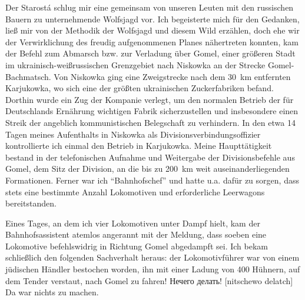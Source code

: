 \documentclass[a5paper,pagesize,10pt,twoside=true]{scrbook}
\newcommand\textcyr[1]{{\fontencoding{OT2}\fontfamily{wncyr}\selectfont #1}}	%
\renewcommand{\marginpar}[2][]{}
\begin{document}
Der Starostá schlug mir eine gemeinsam von unseren Leuten mit den russischen Bauern zu unternehmende Wolfsjagd vor. Ich begeisterte mich für den Gedanken, ließ mir von der Methodik der Wolfsjagd und diesem Wild erzählen, doch ehe wir der Verwirklichung des freudig aufgenommenen Planes nähertreten konnten, kam der Befehl zum Abmarsch bzw. zur Verladung über Gomel, einer größeren Stadt im ukrainisch-weißrussischen Grenzgebiet nach Niskowka an der Strecke Gomel-Bachmatsch. \marginpar{348} Von Niskowka ging eine Zweigstrecke nach dem 30~km entfernten Karjukowka, wo sich eine der größten ukrainischen Zuckerfabriken befand. Dorthin wurde ein Zug der Kompanie verlegt, um den normalen Betrieb der für Deutschlands Ernährung wichtigen Fabrik sicherzustellen und insbesondere einen Streik der angeblich kommunistischen Belegschaft zu verhindern. In den etwa 14 Tagen meines Aufenthalts in Niskowka als Divisionsverbindungsoffizier kontrollierte ich einmal den Betrieb in Karjukowka. Meine Haupttätigkeit bestand in der telefonischen Aufnahme und Weitergabe der Divisionsbefehle aus Gomel, dem Sitz der Division, an die bis zu 200~km weit auseinanderliegenden Formationen. Ferner war ich \enquote{Bahnhofschef} und hatte u.a. dafür zu sorgen, dass stets eine bestimmte Anzahl Lokomotiven und erforderliche Leerwagons bereitstanden.

Eines Tages, an dem ich vier Lokomotiven unter Dampf hielt, kam der Bahnhofsassistent atemlos angerannt mit der Meldung, dass soeben eine Lokomotive befehlswidrig in Richtung Gomel abgedampft sei. Ich bekam schließlich den folgenden Sachverhalt heraus: der Lokomotivführer war von einem jüdischen Händler bestochen worden, ihn mit einer Ladung von 400 Hühnern, auf dem Tender verstaut, nach Gomel zu fahren! \textcyr{Нечего делать!} [nitschewo delatch] Da war nichts zu machen.
\end{document}
